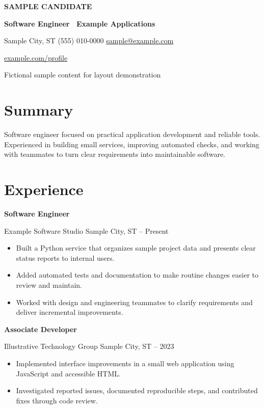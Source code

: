 \documentclass[10pt,letterpaper]{article}
\newcommand{\role}[4]{%
  \Needspace{5\baselineskip}
  {\fontsize{10.25pt}{12.3pt}\selectfont\bfseries #1}\par
  #2 \enspace\textbar\enspace #4 \enspace\textbar\enspace #3\par
  \vspace{2pt}
}
\newenvironment{resumeitems}{%
  \begin{itemize}[leftmargin=1.1em, topsep=0pt, itemsep=2.15pt, parsep=0pt,
    partopsep=0pt, label=\textbullet]
}{\end{itemize}\vspace{4pt}}
\begin{document}
\fontsize{10pt}{12pt}\selectfont
\raggedright

{\centering
  {\fontsize{24pt}{27pt}\selectfont\bfseries\color{resumeNavy} SAMPLE CANDIDATE}\par
  \vspace{3pt}
  {\bfseries Software Engineer \textbar\ Example Applications}\par
  \vspace{5pt}
  Sample City, ST \enspace\textbar\enspace (555) 010-0000
  \enspace\textbar\enspace \href{mailto:sample@example.com}{sample@example.com}\par
  \href{https://example.com/profile}{example.com/profile}\par
  {\small Fictional sample content for layout demonstration}\par
}

\section{Summary}
Software engineer focused on practical application development and reliable tools. Experienced in building small services, improving automated checks, and working with teammates to turn clear requirements into maintainable software.

\section{Experience}
\role{Software Engineer}{Example Software Studio}{2023 -- Present}{Sample City, ST}
\begin{resumeitems}
  \item Built a Python service that organizes sample project data and presents clear status reports to internal users.
  \item Added automated tests and documentation to make routine changes easier to review and maintain.
  \item Worked with design and engineering teammates to clarify requirements and deliver incremental improvements.
\end{resumeitems}

\role{Associate Developer}{Illustrative Technology Group}{2021 -- 2023}{Sample City, ST}
\begin{resumeitems}
  \item Implemented interface improvements in a small web application using JavaScript and accessible HTML.
  \item Investigated reported issues, documented reproducible steps, and contributed fixes through code review.
\end{resumeitems}
\end{document}
